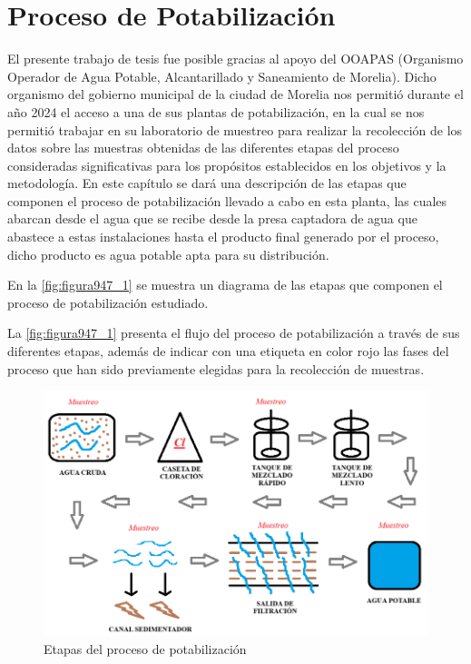 \chapter{Proceso de Potabilización}
\label{ch:ProcesoOoapas}

El presente trabajo de tesis fue posible gracias al apoyo del OOAPAS (Organismo Operador de Agua Potable, Alcantarillado y Saneamiento de Morelia). Dicho organismo del gobierno municipal de la ciudad de Morelia nos permitió 
durante el año 2024 el acceso a una de sus plantas de potabilización, en la cual se nos permitió trabajar en su laboratorio de muestreo para realizar la recolección de los datos sobre las muestras obtenidas de las diferentes
etapas del proceso consideradas significativas para los propósitos establecidos en los objetivos y la metodología. En este capítulo se dará una descripción de las etapas que componen el proceso de potabilización llevado a 
cabo en esta planta, las cuales abarcan desde el agua que se recibe desde la presa captadora de agua que abastece a estas instalaciones hasta el producto final generado por el proceso, dicho producto es agua potable apta 
para su distribución.

En la \autoref{fig:figura947_1} se muestra un diagrama de las etapas que componen el proceso de potabilización estudiado.

La \autoref{fig:figura947_1} presenta el flujo del proceso de potabilización a través de sus diferentes etapas, además de indicar con una etiqueta en color rojo las fases del proceso que han sido previamente elegidas para 
la recolección de muestras.

\clearpage

\begin{figure}[h]
	\centering
	\includegraphics[scale=1]{imgss216.png}
	\caption{Etapas del proceso de potabilización}
	\label{fig:figura947_1}
\end{figure}

